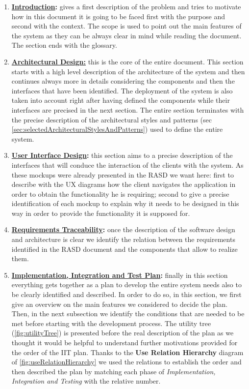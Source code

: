 		\begin{enumerate}
			\item \textbf{\hyperref[sec:introduction]{Introduction}:} gives a first description of the problem and tries to motivate how in this document it is going to be faced first with the purpose and second with the context. The scope is used to point out the main features of the system as they can be always clear in mind while reading the document. The section ends with the glossary.
			
			\item \textbf{\hyperref[sec:architecturalDesign]{Architectural Design:}} this is the core of the entire document. This section starts with a high level description of the architecture of the system and then continues always more in details considering the components and then the interfaces that have been identified. The deployment of the system is also taken into account right after having defined the components while their interfaces are precised in the next section. The entire section terminates with the precise description of the architectural styles and patterns (sec \ref{sec:selectedArchitecturalStylesAndPatterns}) used to define the entire system.
			
			\item \textbf{\hyperref[sec:userInterfaceDesign]{User Interface Design}:} this section aims to a precise description of the interfaces that will conduce the interaction of the clients with the system. As these mockups were already presented in the RASD we want here: first to describe with the UX diagrams how the client navigates the application in order to obtain the functionality he is requiring; second to give a precise identification of each mockup to explain why it needs to be designed in this way in order to provide the functionality it is supposed for.
			
			\item \textbf{\hyperref[sec:requirementsTraceability]{Requirements Traceability}:} once the description of the software design and architecture is clear we identify the relation between the requirements identified in the RASD document \cite{RASD} and the components that allow to realize them.
			
			\item \textbf{\hyperref[sec:iitPlan]{Implementation, Integration and Test Plan}:} finally in this section everything gets together as a plan to develop the entire system needs also to be clearly identified and described. In order to do so, in this section, we first give an overview on the main features we considered to decide the plan. Then, in the next subsection we identify the conditions that are needed to be met before starting with the development process. The utility tree (\autoref{fig:utilityTree}) is presented before the real description of the plan as we thought it would be helpful to understand further motivations provided for the order of the IIT plan. Thanks to the \textbf{Use Relation Hierarchy} diagram of \autoref{fig:useRelationHierarchy} we used the relations to establish the order and then described the plan by matching each phase of \emph{Implementation, Integration and Testing} with the relative number.
			

\end{enumerate}

